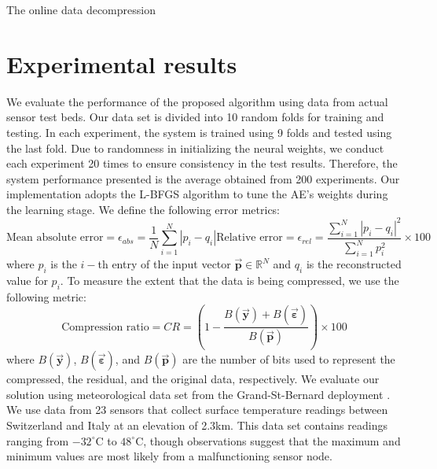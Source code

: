 \documentclass[a4paper,onecolumn,conference]{IEEEtran}
\begin{document}
\begin{algorithm}
	\DontPrintSemicolon
\caption{The online data decompression \label{alg:decompression}}
\end{algorithm}

\vfill\eject
\section{Experimental results }\label{sec:experimental}

We evaluate the performance of the proposed algorithm using data from actual sensor test beds. Our data set is divided into 10 random folds for training and testing. In each experiment, the system is trained using 9 folds and tested using the last fold. Due to randomness in initializing the neural weights, we conduct each experiment 20 times to ensure consistency in the test results. Therefore, the system performance presented is the average obtained from 200 experiments. Our implementation adopts the L-BFGS algorithm \cite{byrd1995limited} to tune the AE's weights during the learning stage. We define the following error metrics:
\begin{subequations}
\begin{equation}
\text{Mean absolute error}=\epsilon_{abs}=\frac{1}{N}\sum_{i=1}^{N}\left|p_{i}-q_{i}\right|
\end{equation}
\begin{equation}
\text{Relative error}=\epsilon_{rel}=\frac{\sum_{i=1}^{N}\left|p_{i}-q_{i}\right|^{2}}{\sum_{i=1}^{N}p_{i}^{2}}\times 100
\end{equation}
\end{subequations}
where $p_{i}$ is the $i-$th entry of the input vector $\vec{\mathbf{p}} \in \mathbb{R}^N$ and $q_{i}$ is the reconstructed value for $p_{i}$. To measure the extent that the data is being compressed, we use the following metric:
\begin{equation}
\text{Compression ratio}=CR=\left(1-\frac{B(\vec{\mathbf{y}})+ B(\vec{\boldsymbol{\varepsilon}})}{B(\vec{\mathbf{p}})}\right)\times100
\end{equation}
where $B(\vec{\mathbf{y}})$, $B(\vec{\boldsymbol{\varepsilon}})$, and $B(\vec{\mathbf{p}})$ are the number of bits used to represent the compressed, the residual, and the original data, respectively. We evaluate our solution using meteorological data set from the Grand-St-Bernard deployment \cite{Sensorscope_Grand}. We use data from 23 sensors that collect surface temperature readings between Switzerland and Italy at an elevation of 2.3km. This data set contains readings ranging from $-32^{\circ}\text{C}$ to $48^{\circ}\text{C}$, though observations suggest that the maximum and minimum values are most likely from a malfunctioning sensor node.
\end{document}
